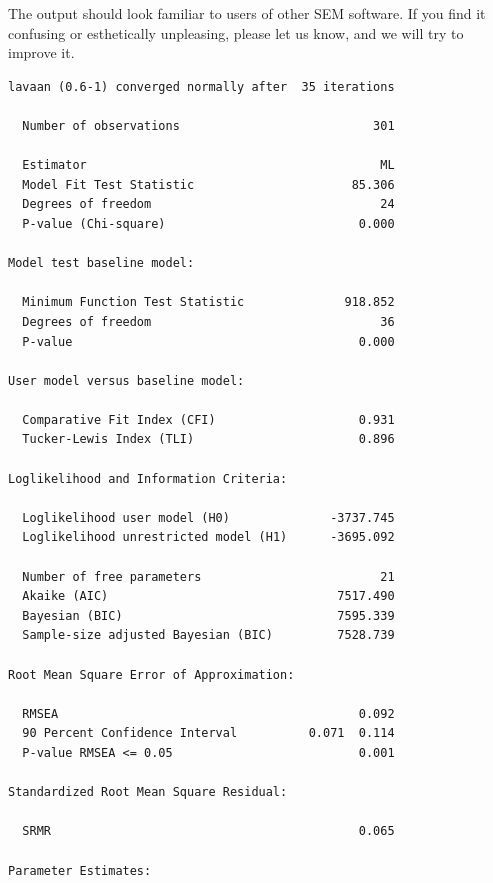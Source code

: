 \begin{Shaded}
\begin{Highlighting}[]
\NormalTok{)}
\end{Highlighting}
\end{Shaded}

The output should look familiar to users of other SEM software. If you
find it confusing or esthetically unpleasing, please let us know, and we
will try to improve it.

\begin{verbatim}
lavaan (0.6-1) converged normally after  35 iterations

  Number of observations                           301

  Estimator                                         ML
  Model Fit Test Statistic                      85.306
  Degrees of freedom                                24
  P-value (Chi-square)                           0.000

Model test baseline model:

  Minimum Function Test Statistic              918.852
  Degrees of freedom                                36
  P-value                                        0.000

User model versus baseline model:

  Comparative Fit Index (CFI)                    0.931
  Tucker-Lewis Index (TLI)                       0.896

Loglikelihood and Information Criteria:

  Loglikelihood user model (H0)              -3737.745
  Loglikelihood unrestricted model (H1)      -3695.092

  Number of free parameters                         21
  Akaike (AIC)                                7517.490
  Bayesian (BIC)                              7595.339
  Sample-size adjusted Bayesian (BIC)         7528.739

Root Mean Square Error of Approximation:

  RMSEA                                          0.092
  90 Percent Confidence Interval          0.071  0.114
  P-value RMSEA <= 0.05                          0.001

Standardized Root Mean Square Residual:

  SRMR                                           0.065

Parameter Estimates:


\end{verbatim}
